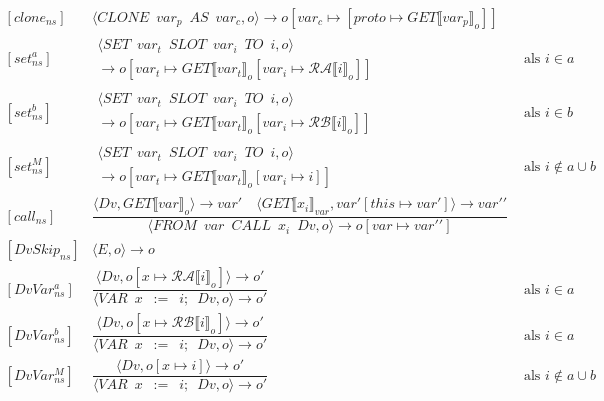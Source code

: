\documentclass[12pt]{article}
\newcommand{\RA}{\mathcal{RA}}
\newcommand{\RB}{\mathcal{RB}}
\begin{document}
\[
\begin{matrix}
[clone_{ns}] &
\langle CLONE \enspace var_p \enspace AS \enspace var_c, o\rangle 
\rightarrow
o[var_c \mapsto [proto \mapsto GET\llbracket var_p \rrbracket_o]]\\
[set_{ns}^{a}] &
\begin{matrix}
\langle SET \enspace var_t \enspace SLOT \enspace var_i \enspace TO \enspace i, o \rangle\\
\rightarrow
o[var_t \mapsto GET\llbracket var_t \rrbracket_o[var_i \mapsto \RA 
 \llbracket i \rrbracket_o]]
\end{matrix}
& \mbox{ als } i \in a \\
[set_{ns}^{b}] &
\begin{matrix}
\langle SET \enspace var_t \enspace SLOT \enspace var_i \enspace TO \enspace i, o \rangle\\
\rightarrow
o[var_t \mapsto GET\llbracket var_t \rrbracket_o[var_i \mapsto \RB 
\llbracket i \rrbracket_o]]
\end{matrix}
& \mbox{ als } i \in b \\
[set_{ns}^{M}] &
\begin{matrix}
\langle SET \enspace var_t \enspace SLOT \enspace var_i \enspace TO \enspace i, o \rangle\\
\rightarrow
o[var_t \mapsto GET\llbracket var_t \rrbracket_o[var_i \mapsto i]]
\end{matrix}
& \mbox{ als } i \not\in a \cup b \\
[call_{ns}] &
\dfrac
{
	\langle Dv, GET\llbracket var \rrbracket_o \rangle \rightarrow var\prime
	\quad
	\langle  GET\llbracket x_i \rrbracket_{var}, var\prime[this \mapsto var\prime] \rangle
	\rightarrow
	var\prime\prime
}
{
	\langle FROM \enspace var \enspace CALL \enspace x_i \enspace Dv,o \rangle
	\rightarrow
	o[var \mapsto var\prime\prime]
}\\
[DvSkip_{ns}] &
\langle E,o \rangle \rightarrow o \\
[DvVar_{ns}^{a}] &
\dfrac
{	\langle Dv,o[x \mapsto \RA \llbracket i \rrbracket_o] \rangle \rightarrow o\prime }
{
	\langle VAR \enspace x \enspace := \enspace i; \enspace Dv, o \rangle
	\rightarrow
	o\prime
} &
\mbox{ als } i \in a \\
[DvVar_{ns}^{b}] &
\dfrac
{	\langle Dv,o[x \mapsto \RB \llbracket i \rrbracket_o] \rangle \rightarrow  o\prime }
{
	\langle VAR \enspace x \enspace := \enspace i; \enspace Dv, o \rangle
	\rightarrow
	o\prime
} &
\mbox{ als } i \in a \\
[DvVar_{ns}^{M}] &
\dfrac
{	\langle Dv,o[x \mapsto i] \rangle \rightarrow o\prime }
{
	\langle VAR \enspace x \enspace := \enspace i; \enspace Dv, o \rangle
	\rightarrow
	o\prime
} &
\mbox{ als } i \not\in a \cup b \\

\end{matrix}
\]
\end{document}
